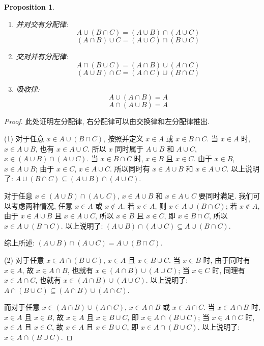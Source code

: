 \documentclass[UTF8]{ctexart}
\theoremstyle{mystyle}
\newtheorem{proposition}{Proposition}[section]
\theoremstyle{myremark}
\theoremstyle{plain}
\begin{document}
\begin{proposition} \ 
    \begin{enumerate}
        \item 并对交有分配律: \[ A \cup (B \cap C) = (A \cup B) \cap (A \cup C) \] \[ (A \cap B) \cup C = (A \cup C) \cap (B \cup C) \]
        \item 交对并有分配律: \[ A \cap (B \cup C) = (A \cap B) \cup (A \cap C) \] \[ (A \cup B) \cap C = (A \cap C) \cup (B \cap C) \]
        \item 吸收律: \[ A \cup (A \cap B) = A \] \[ A \cap (A \cup B) = A \]
    \end{enumerate}
\end{proposition}

\begin{proof}
    此处证明左分配律, 右分配律可以由交换律和左分配律推出.

    (1) 对于任意 $ x \in A \cup (B \cap C) $, 按照并定义 $ x \in A $ 或 $ x \in B \cap C $. 当 $ x \in A $ 时, $ x \in A \cup B $, 也有 $ x \in A \cup C $. 所以 $ x $ 同时属于 $ A \cup B $ 和 $ A \cup C $, $ x \in (A \cup B) \cap (A \cup C) $. 当 $ x \in B \cap C $ 时, $ x \in B $ 且 $ x \in C $. 由于 $ x \in B $, $ x \in A \cup B $; 由于 $ x \in C $, $ x \in A \cup C $. 所以同时有 $ x \in A \cup B $ 和 $ x \in A \cup C $. 以上说明了: $ A \cup (B \cap C) \subseteq (A \cup B) \cap (A \cup C) $.

    对于任意 $ x \in (A \cup B) \cap (A \cup C) $, $ x \in A \cup B $ 和 $ x \in A \cup C $ 要同时满足. 我们可以考虑两种情况, 任意 $ x \in A $ 或 $ x \notin A $. 若 $ x \in A $, 则 $ x \in A \cup (B \cap C) $; 若 $ x \notin A $, 由于 $ x \in A \cup B $ 且 $ x \in A \cup C $, 所以 $ x \in B $ 且 $ x \in C $, 即 $ x \in B \cap C $, 所以 $ x \in A \cup (B \cap C) $. 以上说明了: $ (A \cup B) \cap (A \cup C) \subseteq A \cup (B \cap C) $.

    综上所述: $ (A \cup B) \cap (A \cup C) = A \cup (B \cap C) $.

    (2) 对于任意 $ x \in A \cap (B \cup C) $, $ x \in A $ 且 $ x \in B \cup C $. 当 $ x \in B $ 时, 由于同时有 $ x \in A $, 故 $ x \in A \cap B $, 也就有 $ x \in (A \cap B) \cup (A \cup C) $; 当 $ x \in C $ 时, 同理有 $ x \in A \cap C $, 也就有 $ x \in (A \cap B) \cup (A \cup C) $. 以上说明了: $ A \cap (B \cup C) \subseteq (A \cap B) \cup (A \cap C) $.

    而对于任意 $ x \in (A \cap B) \cup (A \cap C) $, $ x \in A \cap B $ 或 $ x \in A \cap C $. 当 $ x \in A \cap B $ 时, $ x \in A $ 且 $ x \in B $, 故 $ x \in A $ 且 $ x \in B \cup C $, 即 $ x \in A \cap (B \cup C) $; 当 $ x \in A \cap C $ 时, $ x \in A $ 且 $ x \in C $, 故 $ x \in A $ 且 $ x \in B \cup C $, 即 $ x \in A \cap (B \cup C) $. 以上说明了: $ x \in A \cap (B \cup C) $.


\end{proof}
\end{document}

